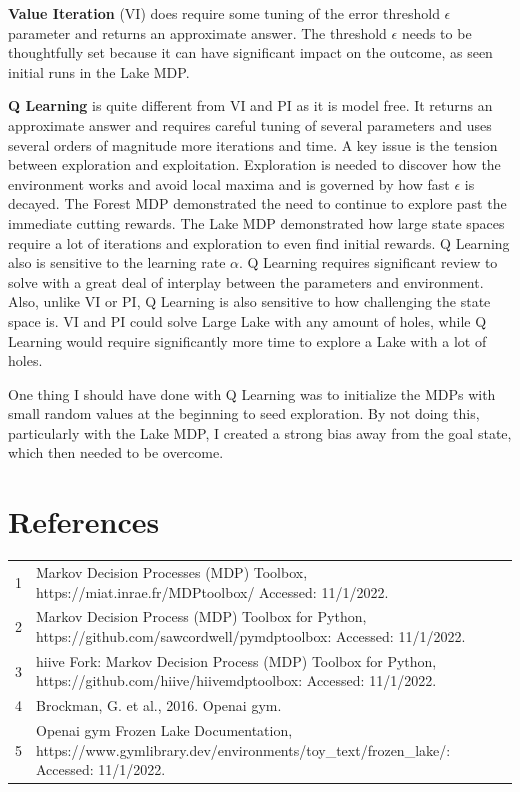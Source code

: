 \documentclass[letterpaper]{article} %
\begin{document}
\textbf{Value Iteration} (VI) does require some tuning of the error threshold $\epsilon$ parameter and returns an approximate answer.   The threshold $\epsilon$ needs to be thoughtfully set because it can have significant impact on the outcome, as seen initial runs in the Lake MDP.  

\textbf{Q Learning} is quite different from VI and PI as it is model free.  It returns an approximate answer and requires careful tuning of several parameters and uses several orders of magnitude more iterations and time.  A key issue is the tension between exploration and exploitation.  Exploration is needed to discover how the environment works and avoid local maxima and is governed by how fast $\epsilon$ is decayed. The Forest MDP demonstrated the need to continue to explore past the immediate cutting rewards.  The Lake MDP demonstrated how large state spaces require a lot of iterations and exploration to even find initial rewards.  Q Learning also is sensitive to the learning rate $\alpha$.  Q Learning requires significant review to solve with a great deal of interplay between the parameters and environment.  Also, unlike VI or PI, Q Learning is also sensitive to how challenging the state space is.  VI and PI could solve Large Lake with any amount of holes, while Q Learning would require significantly more time to explore a Lake with a lot of holes.

One thing I should have done with Q Learning was to initialize the MDPs with small random values at the beginning to seed exploration.  By not doing this, particularly with the Lake MDP, I created a strong bias away from the goal state, which then needed to be overcome. 

\section{References}
\begin{tabular}{l p{2.75in}}
\\
1 & Markov Decision Processes (MDP) Toolbox, https://miat.inrae.fr/MDPtoolbox/ Accessed: 11/1/2022.
\\
2 & Markov Decision Process (MDP) Toolbox for Python, https://github.com/sawcordwell/pymdptoolbox: Accessed: 11/1/2022.
\\
3 & hiive Fork: Markov Decision Process (MDP) Toolbox for Python, https://github.com/hiive/hiivemdptoolbox: Accessed: 11/1/2022.
\\
4 & Brockman, G. et al., 2016. Openai gym.
\\
5 & Openai gym Frozen Lake Documentation,  https://www.gymlibrary.dev/environments/toy\_text/frozen\_lake/: Accessed: 11/1/2022.

\end{tabular}
\end{document}
